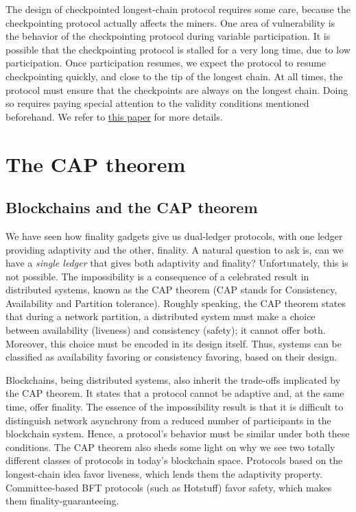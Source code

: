 \documentclass{article}
\begin{document}
The design of checkpointed longest-chain protocol requires some care, because the checkpointing protocol actually affects the miners. One area of vulnerability is the behavior of the checkpointing protocol during variable participation. It is possible that the checkpointing protocol is stalled for a very long time, due to low participation. Once participation resumes, we expect the protocol to resume checkpointing quickly, and close to the tip of the longest chain. At all times, the protocol must ensure that the checkpoints are always on the longest chain. Doing so requires paying special attention to the validity conditions mentioned beforehand. We  refer to \href{https://arxiv.org/pdf/2010.13711.pdf}{this paper} for more details.

\section*{The CAP theorem}
\subsection*{Blockchains and the CAP theorem}
We have seen how finality gadgets give us dual-ledger protocols, with one ledger providing adaptivity and the other, finality. A natural question to ask is, can we have a \textit{single ledger} that gives both adaptivity and finality? Unfortunately, this is not possible. The impossibility is a consequence of a celebrated result in distributed systems, known as the CAP theorem (CAP stands for Consistency, Availability and Partition tolerance). Roughly speaking, the CAP theorem states that during a network partition, a distributed system must make a choice between availability (liveness) and consistency (safety); it cannot offer both. Moreover, this choice must be encoded in its design itself. Thus, systems can be classified as availability favoring or consistency favoring, based on their design.

Blockchains, being distributed systems, also inherit the trade-offs implicated by the CAP theorem. It states that a protocol cannot be adaptive and, at the same time, offer finality. The essence of the impossibility result is that it is difficult to  distinguish network asynchrony from a reduced number of participants in the blockchain system. Hence, a protocol’s behavior must be similar under both these conditions. The CAP theorem also sheds some light on why we see two totally different classes of protocols in today's blockchain space. Protocols based on the longest-chain idea favor liveness, which lends them the adaptivity property. Committee-based BFT protocols (such as Hotstuff) favor safety, which makes them finality-guaranteeing. %
\end{document}
